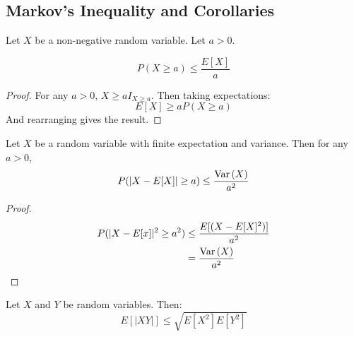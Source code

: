 \documentclass[../Main.tex]{subfiles}
\begin{document}
\subsection{Markov's Inequality and Corollaries}
\begin{theorem}
    Let $X$ be a non-negative random variable. Let $a > 0$.\par
    \begin{equation*}
        P(X \geq a) \leq \frac{E[X]}{a}
    \end{equation*}
    \label{thmMarkovInequality}
\end{theorem}
\begin{proof}
    For any $a > 0$, $X \geq a I_{X \geq a}$. Then taking expectations:
    \begin{equation*}
        E[X] \geq a P(X \geq a)
    \end{equation*}
    And rearranging gives the result.
\end{proof}
\begin{lemma}
    Let $X$ be a random variable with finite expectation and variance. Then for any $a > 0$,
    \begin{equation*}
        P(|X - E[X]| \geq a) \leq \frac{\operatorname{Var}{(X)}}{a^2}
    \end{equation*}
    \label{lemChebyshevInequality}
\end{lemma}
\begin{proof}
    \begin{align*}
        P(|X - E[x]|^2 \geq a^2) &\leq \frac{E[(X - E[X]^2)]}{a^2} \\
        &= \frac{\operatorname{Var}{(X)}}{a^2}
    \end{align*}
\end{proof}
\begin{theorem}
    Let $X$ and $Y$ be random variables. Then:
    \begin{equation*}
        E[|XY|] \leq \sqrt{E[X^2]E[Y^2]}
    \end{equation*}
    \label{thmCauchySchwarz}
\end{theorem}
\end{document}
